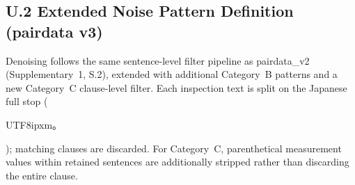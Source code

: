 \documentclass[onecolumn]{article}
\begin{document}
\subsection*{U.2 Extended Noise Pattern Definition (pairdata v3)}
\label{sec:u2_noise_patterns}

Denoising follows the same sentence-level filter pipeline as pairdata\_v2
(Supplementary~1, S.2), extended with additional Category~B patterns
and a new Category~C clause-level filter.
Each inspection text is split on the Japanese full stop
(\begin{CJK}{UTF8}{ipxm}。\end{CJK}); matching clauses are discarded.
For Category~C, parenthetical measurement values within retained sentences
are additionally stripped rather than discarding the entire clause.
\end{document}
